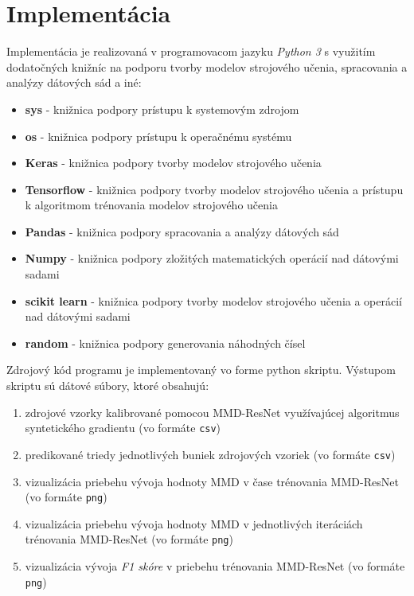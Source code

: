 \chapter{Implementácia}  %
\label{implementacia}

Implementácia je realizovaná v programovacom jazyku \textit{Python 3} s využitím dodatočných knižníc na podporu tvorby modelov strojového učenia, spracovania a analýzy dátových sád a iné:
\begin{itemize}
    \item \textbf{sys} - knižnica podpory prístupu k systemovým zdrojom
    \item \textbf{os} -  knižnica podpory prístupu k operačnému systému
    \item \textbf{Keras} - knižnica podpory tvorby modelov strojového učenia
    \item \textbf{Tensorflow} - knižnica podpory tvorby modelov strojového učenia a prístupu k algoritmom trénovania modelov strojového učenia
    \item \textbf{Pandas} - knižnica podpory spracovania a analýzy dátových sád
    \item \textbf{Numpy} - knižnica podpory zložitých matematických operácií nad dátovými sadami
    \item \textbf{scikit learn} - knižnica podpory tvorby modelov strojového učenia a operácií nad dátovými sadami
    \item \textbf{random} - knižnica podpory generovania náhodných čísel
\end{itemize}

Zdrojový kód programu je implementovaný vo forme python skriptu. Výstupom skriptu sú dátové súbory, ktoré obsahujú:
\begin{enumerate}
    \item zdrojové vzorky kalibrované pomocou MMD-ResNet využívajúcej algoritmus syntetického gradientu (vo formáte \texttt{csv})
    \item predikované triedy jednotlivých buniek zdrojových vzoriek (vo formáte \texttt{csv})
    \item vizualizácia priebehu vývoja hodnoty MMD v čase trénovania MMD-ResNet (vo formáte \texttt{png})
    \item vizualizácia priebehu vývoja hodnoty MMD v jednotlivých iteráciách trénovania MMD-ResNet (vo formáte \texttt{png})
    \item vizualizácia vývoja \textit{F1 skóre} v priebehu trénovania MMD-ResNet (vo formáte \texttt{png})
\end{enumerate}

